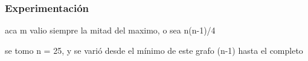 \subsubsection{Experimentación}

%
%
%
%





aca m valio siempre la mitad del maximo, o sea n(n-1)/4



se tomo n = 25, y se varió desde el mínimo de este grafo (n-1) hasta el completo
